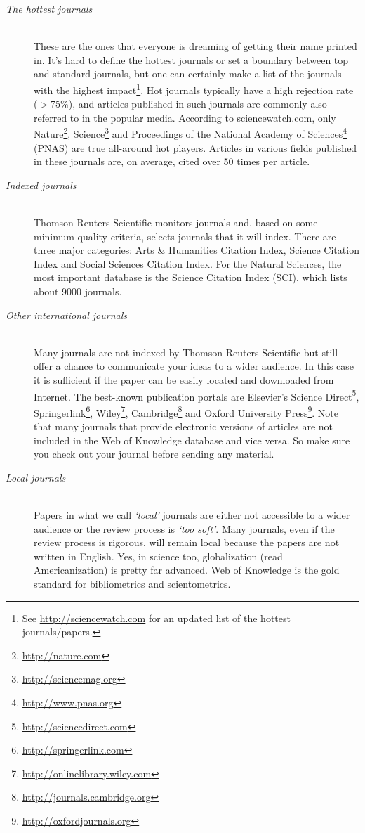 \documentclass[graybox,envcountchap,sectrefs,UStrade]{svmono}
\begin{document}
\begin{description}
\item[\emph{The hottest journals}] \hfill \\
    These are the ones that everyone is dreaming of getting their name printed in. It's hard to define the hottest journals or set a boundary between top and standard journals, but one can certainly make a list of the journals with the highest impact\footnote{See \url{http://sciencewatch.com} for an updated list of the hottest journals/papers.}. Hot journals typically have a high rejection rate ($>$75\%), and articles published in such journals are commonly also referred to in the popular media. According to sciencewatch.com, only Nature\footnote{\url{http://nature.com}}, Science\footnote{\url{http://sciencemag.org}} and Proceedings of the National Academy of Sciences\footnote{\url{http://www.pnas.org}} (PNAS) are true all-around hot players. Articles in various fields published in these journals are, on average, cited over 50 times per article.\medskip
\item[\emph{Indexed journals}] \hfill \\
    Thomson Reuters Scientific monitors journals and, based on some minimum quality criteria, selects journals that it will index. There are three major categories: Arts \& Humanities Citation Index, Science Citation Index and Social Sciences Citation Index. For the Natural Sciences, the most important database is the Science Citation Index (SCI), which lists about 9000 journals. \medskip
\item[\emph{Other international journals}] \hfill \\
    Many journals are not indexed by Thomson Reuters Scientific but still offer a chance to communicate your ideas to a wider audience. In this case it is sufficient if the paper can be easily located and downloaded from Internet. The best-known publication portals are Elsevier's Science Direct\footnote{\url{http://sciencedirect.com}}, Springerlink\footnote{\url{http://springerlink.com}}, Wiley\footnote{\url{http://onlinelibrary.wiley.com}}, Cambridge\footnote{\url{http://journals.cambridge.org}} and Oxford University Press\footnote{\url{http://oxfordjournals.org}}. Note that many journals that provide electronic versions of articles are not included in the Web of Knowledge database and vice versa. So make sure you check out your journal before sending any material.\medskip
\item[\emph{Local journals}] \hfill \\
    Papers in what we call \emph{`local'} journals are either not accessible to a wider audience or the review process is \emph{`too soft'}. Many journals, even if the review process is rigorous, will remain local because the papers are not written in English. Yes, in science too, globalization (read Americanization) is pretty far advanced. Web of Knowledge is the gold standard for bibliometrics and scientometrics.
\end{description}
\end{document}
